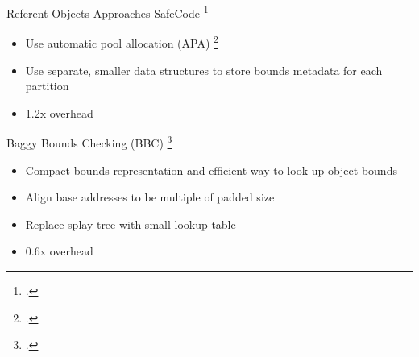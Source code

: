 \documentclass[aspectratio=169]{beamer}
\begin{document}
\begin{frame}[fragile]{Referent Objects Approaches}
SafeCode \footcite{dhurjati_backwards-compatible_2006}
    \begin{itemize}
        \item Use automatic pool allocation (APA) \footcite{lattner_automatic_2005}
        \item Use separate, \alert{smaller} data structures to store bounds metadata for \alert{each partition}
        \item 1.2x overhead
    \end{itemize}

\pause

Baggy Bounds Checking (BBC) \footcite{akritidis_baggy_2009}
    \begin{itemize}
    \item Compact bounds representation and efficient way to look up object bounds
    \item Align base addresses to be multiple of padded size
    \item Replace splay tree with small lookup table
    \item 0.6x overhead 
    \end{itemize}
\vspace{0.2in}

\end{frame}
\end{document}
